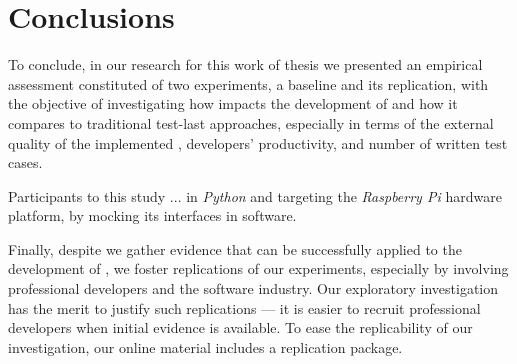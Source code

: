\chapter{Conclusions}
To conclude, in our research for this work of thesis we presented an empirical assessment constituted of two experiments, a baseline and its replication, with the objective of investigating how \tdd impacts the development of \ess and how it compares to traditional test-last approaches, especially in terms of the external quality of the implemented \es, developers' productivity, and number of written test cases.

Participants to this study ... in \textit{Python} and targeting the \textit{Raspberry Pi} hardware platform, by mocking its interfaces in software.


Finally, despite we gather evidence that \tdd can be successfully applied to the development of \ess, we foster replications of our experiments, especially by involving professional developers and the software industry. Our exploratory investigation has the merit to justify such replications — it is easier to recruit professional developers when initial evidence is available. To ease the replicability of our investigation, our online material includes a replication package.